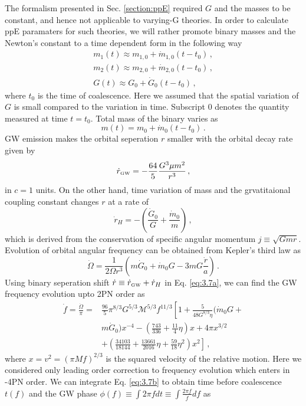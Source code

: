 \documentclass[prd,twocolumn,nofootinbib]{revtex4-1}
\newcommand{\GW}{{\mbox{\tiny GW}}}
\begin{document}
The formalism presented in Sec. \ref{section:ppE} required $G$ and the masses to be constant, and hence not applicable to varying-G theories. In order to calculate ppE paramaters for such theories, we will rather promote binary masses and the Newton's constant to a time dependent form in the following way
 \begin{eqnarray}\label{eq:3.7a2}
 m_1(t)\approx m_{1,0}+\dot{m}_{1,0}(t-t_0)\,, \\
 \label{eq:3.7a3}  m_2(t)\approx m_{2,0}+\dot{m}_{2,0}(t-t_0)\,, \\
   \label{eq:3.7a4}  G(t)\approx  G_0+\dot{G}_0(t-t_0)\, , 
 \end{eqnarray}
where $t_0$ is the time of coalescence. Here we assumed that the spatial variation of $G$ is small compared to the variation in time. Subscript $0$ denotes the quantity measured at time $t=t_0$. Total mass of the binary varies as
 \begin{equation}
 m(t)=m_0+\dot{m}_0(t-t_0)\,.
 \end{equation}
 GW emission makes the orbital seperation $r$ smaller with the orbital decay rate given by \cite{PhysRevD.49.2658}
 \begin{equation}
 \dot{r}_{\GW}=-\frac{64}{5}\frac{G^3 \mu m^2}{r^3}\,,
 \end{equation}
 in $c=1$ units. On the other hand, time variation of mass and the grvatitaional coupling constant changes $r$ at a rate of 
 \begin{equation}
 \dot{r}_H=-\left(\frac{\dot{G}_0}{G}+\frac{\dot{m}_0}{m}\right)\,,
 \end{equation}
 which is derived from the conservation of specific angular momentum $j\equiv\sqrt{Gmr}$. Evolution of orbital angular frequency can be obtained from Kepler's third law as
 \begin{equation}\label{eq:3.7a}
 \dot{\Omega}=\frac{1}{2\Omega r^3}\left(m\dot{G}_0+\dot{m}_0G-3mG\frac{\dot{r}}{a}\right)\,.
 \end{equation}
Using binary seperation shift $\dot{r}\equiv \dot{r}_{\GW}+\dot{r}_H$ in Eq. \eqref{eq:3.7a}, we can find the GW frequency evolution upto 2PN order as
\begin{align} \label{eq:3.7b}
 \dot{f}=\frac{\dot{\Omega}}{\pi}=& \frac{96}{5}\pi^{8/3}G^{5/3}\mathcal{M}^{5/3}f^{11/3}\left[1+\frac{5}{48 G^{8/3}\eta}(\dot{m}_0G+ \right.\nonumber\\ & \left. m\dot{G}_0)x^{-4} -\left(\frac{743}{336}+\frac{11}{4}\eta\right)x+4\pi x^{3/2}\right.\nonumber\\ & \left. + \left(\frac{34103}{18144}+\frac{13661}{2016}\eta+\frac{59}{18}\eta^2\right)x^2 \right]\,,
\end{align}
where $x=v^2=(\pi M f)^{2/3}$ is the squared velocity of the relative motion. Here we considered only leading order correction to frequency evolution which enters in -4PN order. We can integrate Eq. \eqref{eq:3.7b} to obtain time before coalescence $t(f)$ and the GW phase $\phi(f)\equiv \int 2 \pi f dt \equiv \int\frac{2\pi f}{\dot{f}}df$ as
\end{document}
